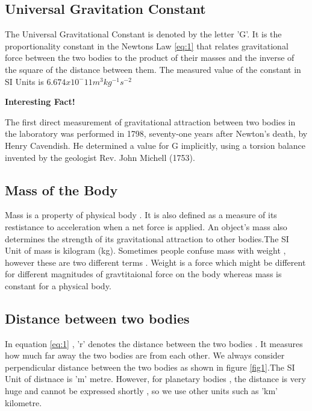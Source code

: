 \subsection{Universal Gravitation Constant}
The Universal Gravitational Constant is denoted by the letter 'G'. It is the proportionality constant in the Newtons Law \ref{eq:1} that relates gravitational force between the two bodies to the product of their masses and the inverse of the square of the distance between them. The measured value of the constant in SI Units is $ 6.674x10^-11 m^3 kg^{-1} s^{-2} $ \par
\textbf{\bfseries \large Interesting Fact!} \par
The first direct measurement of gravitational attraction between two bodies in the laboratory was performed in 1798, seventy-one years after Newton's death, by Henry Cavendish. He determined a value for G implicitly, using a torsion balance invented by the geologist Rev. John Michell (1753).
\subsection{Mass of the Body}
 Mass is a property of physical body . It is also defined as a measure of its restistance to acceleration when a net force is 
applied. An object's mass also determines the strength of its gravitational attraction to other bodies.The SI Unit of mass is kilogram (kg). 
Sometimes people confuse mass with weight , however these are two different terms . Weight is a force which might be different for different magnitudes of gravtitaional force on the body whereas mass is constant for a physical body.
\subsection{Distance between two bodies}
In equation \ref{eq:1} , 'r' denotes the distance between the two bodies . It measures how much far away the two bodies are from each other.
We always consider perpendicular distance between the two bodies as shown in figure \ref{fig1}.The SI Unit of distnace is 'm' metre.
However, for planetary bodies , the distance is very huge and cannot be expressed shortly , so we use other units such as 'km' kilometre. 
